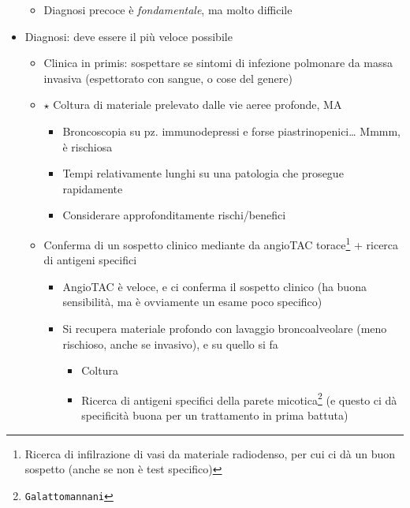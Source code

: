 \documentclass[italian,]{article}
\providecommand{\tightlist}{%
  \setlength{\itemsep}{0pt}\setlength{\parskip}{0pt}}
\newcommand{\goldstandard}{\textcircled{$\star$} }                      %
\begin{document}
\begin{itemize}
  \begin{itemize}
  \tightlist
  \item
    Diagnosi precoce è \emph{fondamentale}, ma molto difficile
  \end{itemize}
\item
  Diagnosi: deve essere il più veloce possibile

  \begin{itemize}
  \tightlist
  \item
    Clinica in primis: sospettare se sintomi di infezione polmonare da
    massa invasiva (espettorato con sangue, o cose del genere)
  \item
    \goldstandard Coltura di materiale prelevato dalle vie aeree
    profonde, MA

    \begin{itemize}
    \tightlist
    \item
      Broncoscopia su pz. immunodepressi e forse piastrinopenici\ldots{}
      Mmmm, è rischiosa
    \item
      Tempi relativamente lunghi su una patologia che prosegue
      rapidamente
    \item
      Considerare approfonditamente rischi/benefici
    \end{itemize}
  \item
    Conferma di un sospetto clinico mediante da angioTAC
    torace\footnote{Ricerca di infilrazione di vasi da materiale
      radiodenso, per cui ci dà un buon sospetto (anche se non è test
      specifico)} + ricerca di antigeni specifici

    \begin{itemize}
    \tightlist
    \item
      AngioTAC è veloce, e ci conferma il sospetto clinico (ha buona
      sensibilità, ma è ovviamente un esame poco specifico)
    \item
      Si recupera materiale profondo con lavaggio broncoalveolare (meno
      rischioso, anche se invasivo), e su quello si fa

      \begin{itemize}
      \tightlist
      \item
        Coltura
      \item
        Ricerca di antigeni specifici della parete micotica\footnote{\texttt{Galattomannani}}
        (e questo ci dà specificità buona per un trattamento in prima
        battuta)
      \end{itemize}
    \end{itemize}
  \end{itemize}
\end{itemize}
\end{document}
